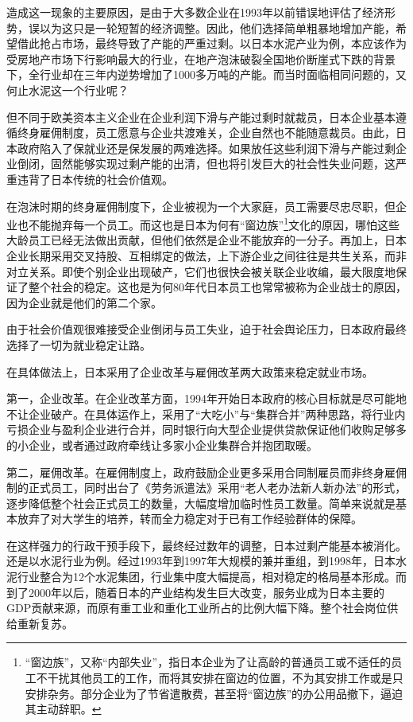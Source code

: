 造成这一现象的主要原因，是由于大多数企业在1993年以前错误地评估了经济形势，误以为这只是一轮短暂的经济调整。因此，他们选择简单粗暴地增加产能，希望借此抢占市场，最终导致了产能的严重过剩。以日本水泥产业为例，本应该作为受房地产市场下行影响最大的行业，在地产泡沫破裂全国地价断崖式下跌的背景下，全行业却在三年内逆势增加了1000多万吨的产能。而当时面临相同问题的，又何止水泥这一个行业呢？

但不同于欧美资本主义企业在企业利润下滑与产能过剩时就裁员，日本企业基本遵循终身雇佣制度，员工愿意与企业共渡难关，企业自然也不能随意裁员。由此，日本政府陷入了保就业还是保发展的两难选择。如果放任这些利润下滑与产能过剩企业倒闭，固然能够实现过剩产能的出清，但也将引发巨大的社会性失业问题，这严重违背了日本传统的社会价值观。

在泡沫时期的终身雇佣制度下，企业被视为一个大家庭，员工需要尽忠尽职，但企业也不能抛弃每一个员工。而这也是日本为何有“窗边族”\footnote{“窗边族”，又称“内部失业”，指日本企业为了让高龄的普通员工或不适任的员工不干扰其他员工的工作，而将其安排在窗边的位置，不为其安排工作或是只安排杂务。部分企业为了节省遣散费，甚至将“窗边族”的办公用品撤下，逼迫其主动辞职。}文化的原因，哪怕这些大龄员工已经无法做出贡献，但他们依然是企业不能放弃的一分子。再加上，日本企业长期采用交叉持股、互相绑定的做法，上下游企业之间往往是共生关系，而非对立关系。即使个别企业出现破产，它们也很快会被关联企业收编，最大限度地保证了整个社会的稳定。这也是为何80年代日本员工也常常被称为企业战士的原因，因为企业就是他们的第二个家。

由于社会价值观很难接受企业倒闭与员工失业，迫于社会舆论压力，日本政府最终选择了一切为就业稳定让路。

在具体做法上，日本采用了企业改革与雇佣改革两大政策来稳定就业市场。

第一，企业改革。在企业改革方面，1994年开始日本政府的核心目标就是尽可能地不让企业破产。在具体运作上，采用了“大吃小”与“集群合并”两种思路，将行业内亏损企业与盈利企业进行合并，同时银行向大型企业提供贷款保证他们收购足够多的小企业，或者通过政府牵线让多家小企业集群合并抱团取暖。

第二，雇佣改革。在雇佣制度上，政府鼓励企业更多采用合同制雇员而非终身雇佣制的正式员工，同时出台了《劳务派遣法》采用“老人老办法新人新办法”的形式，逐步降低整个社会正式员工的数量，大幅度增加临时性员工数量。简单来说就是基本放弃了对大学生的培养，转而全力稳定对于已有工作经验群体的保障。

在这样强力的行政干预手段下，最终经过数年的调整，日本过剩产能基本被消化。还是以水泥行业为例。经过1993年到1997年大规模的兼并重组，到1998年，日本水泥行业整合为12个水泥集团，行业集中度大幅提高，相对稳定的格局基本形成。而到了2000年以后，随着日本的产业结构发生巨大改变，服务业成为日本主要的GDP贡献来源，而原有重工业和重化工业所占的比例大幅下降。整个社会岗位供给重新复苏。

